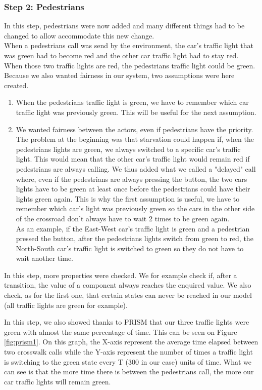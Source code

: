 \subsubsection{Step 2: Pedestrians}
In this step, pedestrians were now added and many different things had to be changed to allow accommodate this new change. \\ 

When a pedestrians call was send by the environment, the car's traffic light that was green had to become red and the other car traffic light had to stay red. When those two traffic lights are red, the pedestrians traffic light could be green. Because we also wanted fairness in our system, two assumptions were here created.
\begin{enumerate}
    \item When the pedestrians traffic light is green, we have to remember which car traffic light was previously green. This will be useful for the next assumption.
    \item We wanted fairness between the actors, even if pedestrians have the priority. The problem at the beginning was that starvation could happen if, when the pedestrians lights are green, we always switched to a specific car's traffic light. This would mean that the other car's traffic light would remain red if pedestrians are always calling. We thus added what we called a "delayed" call where, even if the pedestrians are always pressing the button, the two cars lights have to be green at least once before the pedestrians could have their lights green again. This is why the first assumption is useful, we have to remember which car's light was previously green so the cars in the other side of the crossroad don't always have to wait 2 times to be green again. \\
    As an example, if the East-West car's traffic light is green and a pedestrian pressed the button, after the pedestrians lights switch from green to red, the North-South car's traffic light is switched to green so they do not have to wait another time.
\end{enumerate}
In this step, more properties were checked. We for example check if, after a transition, the value of a component always reaches the enquired value. We also check, as for the first one, that certain states can never be reached in our model (all traffic lights are green for example).

\noindent In this step, we also showed thanks to PRISM that our three traffic lights were green with almost the same percentage of time. This can be seen on Figure \ref{fig:prism1}. On this graph, the X-axis represent the average time elapsed between two crosswalk calls while the Y-axis represent the number of times a traffic light is switching to the green state every T (300 in our case) units of time. What we can see is that the more time there is between the pedestrians call, the more our car traffic lights will remain green.

